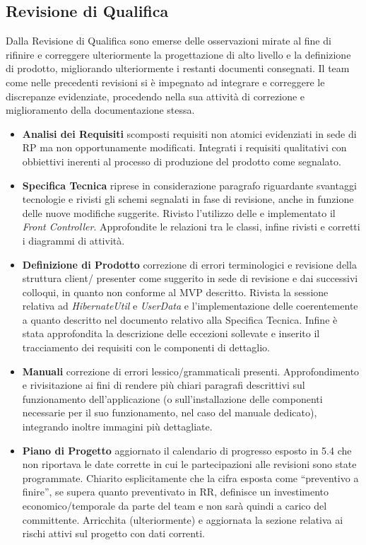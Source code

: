 \subsection{Revisione di Qualifica}
Dalla Revisione di Qualifica sono emerse delle osservazioni mirate al fine di rifinire e correggere ulteriormente la progettazione di alto livello e la definizione di prodotto, migliorando ulteriormente i restanti documenti consegnati. Il team come nelle precedenti revisioni si è impegnato ad integrare e correggere le discrepanze evidenziate, procedendo nella sua attività di correzione e miglioramento della documentazione stessa.
\begin{itemize}
\item \textbf{Analisi dei Requisiti} scomposti requisiti non atomici evidenziati in sede di RP ma non opportunamente modificati. Integrati i requisiti qualitativi con obbiettivi inerenti al processo di produzione del prodotto come segnalato.
\item \textbf{Specifica Tecnica} riprese in considerazione paragrafo riguardante svantaggi tecnologie e rivisti gli schemi segnalati in fase di revisione, anche in funzione delle nuove modifiche suggerite. Rivisto l'utilizzo delle  e implementato il  \textit{Front Controller}. Approfondite le relazioni tra le classi, infine rivisti e corretti i diagrammi di attività.
\item \textbf{Definizione di Prodotto} correzione di errori terminologici e revisione della struttura client/ presenter come suggerito in sede di revisione e dai successivi colloqui, in quanto non conforme al  MVP descritto. Rivista la sessione relativa ad \textit{HibernateUtil} e \textit{UserData} e l'implementazione delle  coerentemente a quanto descritto nel documento relativo alla Specifica Tecnica. Infine è stata approfondita la descrizione delle eccezioni sollevate e inserito il tracciamento dei requisiti con le componenti di dettaglio.
\item \textbf{Manuali} correzione di errori lessico/grammaticali presenti. Approfondimento e rivisitazione ai fini di rendere più chiari paragrafi descrittivi sul funzionamento dell'applicazione (o sull'installazione delle componenti necessarie per il suo funzionamento, nel caso del manuale dedicato), integrando inoltre immagini più dettagliate. 
\item \textbf{Piano di Progetto} aggiornato il calendario di progresso esposto in 5.4 che non riportava le date corrette in cui le partecipazioni alle revisioni sono state programmate. Chiarito esplicitamente che la cifra esposta come ``preventivo a finire'', se supera quanto preventivato in RR, definisce un investimento economico/temporale da parte del team e non sarà quindi a carico del committente. Arricchita (ulteriormente) e aggiornata la sezione relativa ai rischi attivi sul progetto con dati correnti.

\end{itemize}
